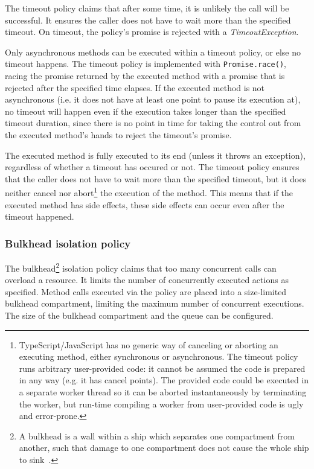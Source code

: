 The timeout policy claims that after some time, it is unlikely the call will be successful. It ensures the caller does not have to wait more than the specified timeout. On timeout, the policy's promise is rejected with a \emph{TimeoutException}.

Only asynchronous methods can be executed within a timeout policy, or else no timeout happens. The timeout policy is implemented with \lstinline{Promise.race()}, racing the promise returned by the executed method with a promise that is rejected after the specified time elapses. If the executed method is not asynchronous (i.e. it does not have at least one point to pause its execution at), no timeout will happen even if the execution takes longer than the specified timeout duration, since there is no point in time for taking the control out from the executed method's hands to reject the timeout's promise.

The executed method is fully executed to its end (unless it throws an exception), regardless of whether a timeout has occured or not. The timeout policy ensures that the caller does not have to wait more than the specified timeout, but it does neither cancel nor abort\footnote{TypeScript/JavaScript has no generic way of canceling or aborting an executing method, either synchronous or asynchronous. The timeout policy runs arbitrary user-provided code: it cannot be assumed the code is prepared in any way (e.g. it has cancel points). The provided code could be executed in a separate worker thread so it can be aborted instantaneously by terminating the worker, but run-time compiling a worker from user-provided code is ugly and error-prone.} the execution of the method. This means that if the executed method has side effects, these side effects can occur even after the timeout happened.

\subsubsection{Bulkhead isolation policy}

The bulkhead\footnote{A bulkhead is a wall within a ship which separates one compartment from another, such that damage to one compartment does not cause the whole ship to sink~\cite{pollygithub}.} isolation policy claims that too many concurrent calls can overload a resource. It limits the number of concurrently executed actions as specified. Method calls executed via the policy are placed into a size-limited bulkhead compartment, limiting the maximum number of concurrent executions. The size of the bulkhead compartment and the queue can be configured.

